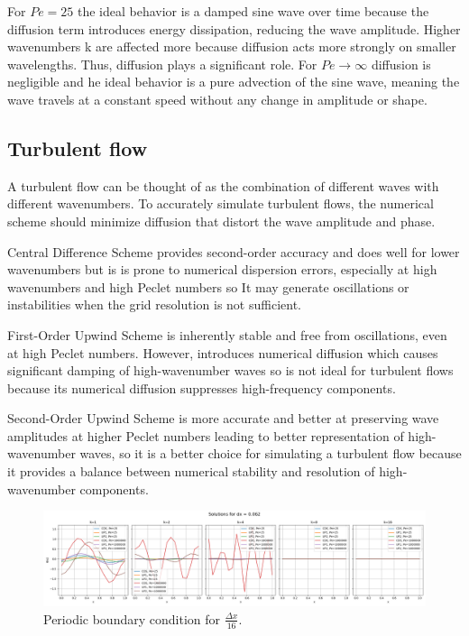 \documentclass{article}
\begin{document}
For \( Pe = 25 \) the ideal behavior is a damped sine wave over time because the diffusion term introduces energy dissipation, reducing the
wave amplitude. Higher wavenumbers k are affected more because diffusion acts more strongly on smaller wavelengths. Thus, diffusion plays a 
significant role. For \( Pe \to \infty \) diffusion is negligible and he ideal behavior is a pure advection of the sine wave, meaning the wave 
travels at a constant speed without any change in amplitude or shape.

\subsection{Turbulent flow}
A turbulent flow can be thought of as the combination of different waves with different wavenumbers. To accurately simulate turbulent flows, 
the numerical scheme should minimize diffusion that distort the wave amplitude and phase. 

Central Difference Scheme provides second-order accuracy and does well for lower wavenumbers but is is prone to numerical dispersion errors, 
especially at high wavenumbers and high Peclet numbers so It may generate oscillations or instabilities when the grid resolution is not sufficient.

First-Order Upwind Scheme is inherently stable and free from oscillations, even at high Peclet numbers. However, introduces numerical diffusion 
which causes significant damping of high-wavenumber waves so is not ideal for turbulent flows because its numerical diffusion suppresses high-frequency components.

Second-Order Upwind Scheme is more accurate and better at preserving wave amplitudes at higher Peclet numbers leading to better representation of high-wavenumber waves, 
so it is a better choice for simulating a turbulent flow because it provides a balance between numerical stability and resolution of high-wavenumber components.

\begin{figure}[h!]
    \centering
    \includegraphics[width=1\textwidth]{task5_dx_16.png}
    \caption{Periodic boundary condition for \(\frac{\Delta x}{16}\).}
    \label{fig:periodic_dx_16}
\end{figure}
\end{document}
